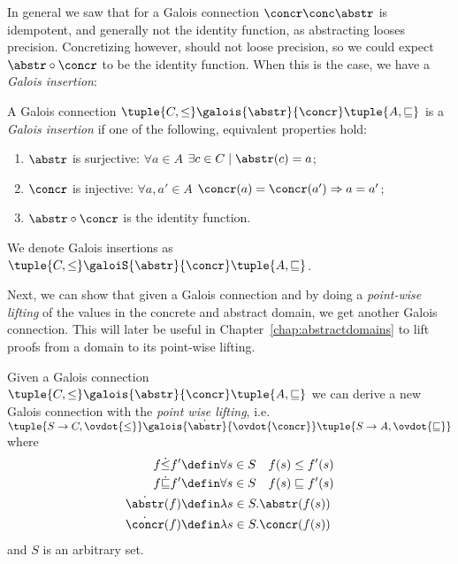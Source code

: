 In general we saw that for a Galois connection \(\concr \conc \abstr\)
is idempotent, and generally not the identity function, as abstracting
looses precision. Concretizing however, should not loose precision, so
we could expect \(\abstr \circ \concr\) to be the identity
function. When this is the case, we have a \emph{Galois insertion}:

\begin{definition}\label{def:insertion}
  A Galois
  connection \(\tuple{C, \leq} \galois{\abstr}{\concr} \tuple{A,
    \sqsubseteq}\) is a \emph{Galois insertion} if one of the
  following, equivalent properties hold:
  \begin{enumerate}
  \item \(\abstr\) is surjective: \(\forall a \in A\)
    \(\exists c \in C \mid \abstr(c) = a\);
  \item \(\concr\) is injective: \(\forall a, a'\in A\)
    \(\concr(a) = \concr(a') \Rightarrow a = a'\);
  \item \(\abstr \circ \concr\) is the identity function.
  \end{enumerate}
  We denote Galois insertions as
  \(\tuple{C, \leq} \galoiS{\abstr}{\concr} \tuple{A, \sqsubseteq}\).
\end{definition}

Next, we can show that given a Galois connection and by doing a
\emph{point-wise lifting} of the values in the concrete and abstract
domain, we get another Galois connection. This will later be useful in
Chapter~\ref{chap:abstractdomains} to lift proofs from a domain to its
point-wise lifting.

\begin{theorem}\label{th:pointwiseconn}
  Given a Galois connection
  \(\tuple{C, \leq} \galois{\abstr}{\concr} \tuple{A, \sqsubseteq}\)
  we can derive a new Galois connection with the \emph{point wise
    lifting}, i.e.
  \(\tuple{S\to C, \ovdot{\leq}} \galois{\dot\abstr}{\ovdot{\concr}}
  \tuple{S\to A, \ovdot{\sqsubseteq}}\) where
  \begin{align*}
    f \dot\leq f' & \defin \forall s \in S \quad f(s) \leq f'(s)\\
    f \dot\sqsubseteq f' & \defin \forall s \in S \quad f(s) \sqsubseteq f'(s)\\
    \dot\abstr(f) & \defin \lambda s \in S . \abstr(f(s)) \\
    \dot\concr(f) & \defin \lambda s \in S . \concr(f(s)) \\
  \end{align*}
  and \(S\) is an arbitrary set.
\end{theorem}

